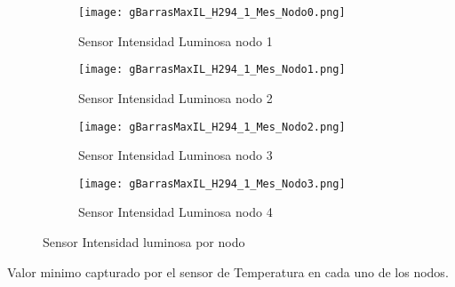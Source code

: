 \documentclass{article}
\begin{document}
        \begin{figure}[h!]
            \centering\begin{subfigure}[h]{0.42\linewidth}
                                    \texttt{[image: gBarrasMaxIL\_H294\_1\_Mes\_Nodo0.png]}
                                    \caption{Sensor Intensidad Luminosa nodo 1}
                                    \label{fig:ILMax1}
                                \end{subfigure}
                                \begin{subfigure}[h]{0.42\linewidth}
                                    \texttt{[image: gBarrasMaxIL\_H294\_1\_Mes\_Nodo1.png]}
                                    \caption{Sensor Intensidad Luminosa nodo 2}
                                    \label{fig:ILMax2}
                                \end{subfigure}
                                \begin{subfigure}[h]{0.42\linewidth}
                                    \texttt{[image: gBarrasMaxIL\_H294\_1\_Mes\_Nodo2.png]}
                                    \caption{Sensor Intensidad Luminosa nodo 3}
                                    \label{fig:ILMax3}
                                \end{subfigure}
                                \begin{subfigure}[h]{0.42\linewidth}
                                    \texttt{[image: gBarrasMaxIL\_H294\_1\_Mes\_Nodo3.png]}
                                    \caption{Sensor Intensidad Luminosa nodo 4}
                                    \label{fig:ILMax4}
                                \end{subfigure}
                                \caption{Sensor Intensidad luminosa por nodo}
            \label{fig:fig6}
        \end{figure}
        \newline
        \newline Valor minimo capturado por el sensor de Temperatura en cada uno de los nodos.
\end{document}
